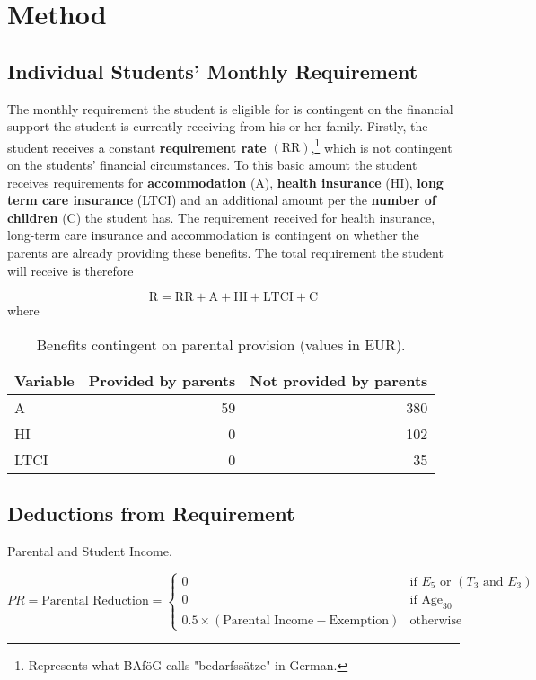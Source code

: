 \section{Method}


\subsection{Individual Students' Monthly Requirement}
The monthly requirement the student is eligible for is contingent on the financial support 
the student is currently receiving from his or her family. 
Firstly, the student receives a constant \textbf{requirement rate} \( (\text{RR})  \),\footnote{Represents what BAföG calls "bedarfssätze" in German.} which is not contingent on the students' financial 
circumstances. To this basic amount the student receives requirements for \textbf{accommodation} (A), 
\textbf{health insurance} (HI), \textbf{long term care insurance} (LTCI) and an additional amount per the 
\textbf{number of children} (C) the student has. 
The requirement received for health insurance, long-term care insurance and accommodation is contingent on 
whether the parents are already providing these benefits. 
The total requirement the student will receive is therefore 

\begin{equation} \label{eq:total-requirement}
  \text{R} = \text{RR}  + \text{A} + \text{HI} + \text{LTCI} + \text{C}
\end{equation}
where
\begin{table}[H]
\small
\centering
  \begin{tabular}{lrr}
  \hline
  Variable & Provided by parents & Not provided by parents \\
  \hline
  A & 59 & 380 \\
  HI & 0 & 102 \\
  LTCI & 0 & 35 \\
  \hline
  \end{tabular}
\caption{Benefits contingent on parental provision (values in EUR).}
\end{table}



\subsection{Deductions from Requirement}
Parental and Student Income.

\begin{equation} \label{eq:parental-reduction}
  PR = \text{Parental Reduction} = 
  \begin{cases}
    0 & \text{if } E_5 \text{ or } (T_3 \text{ and } E_3) \\
    0 & \text{if } \text{Age}_{30} \\
    0.5 \times (\text{Parental Income} - \text{Exemption}) & \text{otherwise}
  \end{cases}
\end{equation}

